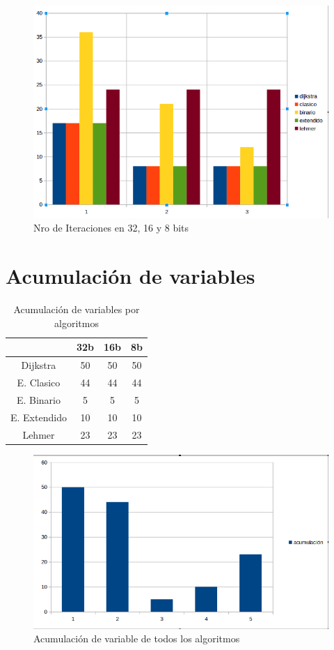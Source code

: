 \begin{figure}[h]
 \centering
 \includegraphics[scale=0.4]{pictures/iteracion.png}
 \caption{Nro de Iteraciones en 32, 16 y 8 bits}
 \label{fig:2}
\end{figure}


\section{Acumulaci\'on de variables}

\begin{table}[H]
\label{tablax}
\begin{center}
\begin{tabular}{|c|c|c|c|}
\hline 
 &32b&16b&8b \\
\hline
Dijkstra& 50 & 50 & 50 \\ \hline
E. Clasico& 44 & 44 & 44 \\ \hline
E. Binario& 5 & 5 & 5 \\ \hline
E. Extendido& 10 & 10 & 10 \\ \hline
Lehmer& 23 & 23 & 23 \\ \hline
\end{tabular}
\end{center}
\caption{Acumulaci\'on de variables por algoritmos}
\end{table}


\begin{figure}[h]
 \centering
 \includegraphics[scale=0.4]{pictures/acmulac.png}
 \caption{Acumulación de variable de todos los algoritmos}
 \label{fig:3}
\end{figure}

